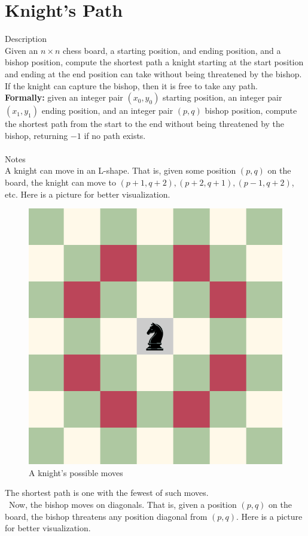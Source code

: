 \documentclass[11pt]{exam}
\begin{document}
\section*{Knight's Path}

{\large Description}\\
Given an $n\times n$ chess board, a starting position, and ending position,
and a bishop position, compute the shortest path a knight starting at the
start position and ending at the end position can take without being
threatened by the bishop. If the knight can capture the bishop, then
it is free to take any path.\\
\textbf{Formally:} given an integer pair $(x_0,y_0)$ starting position, an integer pair $(x_1, y_1)$ ending position, and an integer pair $(p, q)$ bishop position, compute the shortest path from the start to the end without being threatened by the bishop, returning $-1$ if no path exists.\\\\
{\large Notes}\\
A knight can move in an L-shape. That is, given some position $(p,q)$ on
the board, the knight can move to $(p+1,q+2), (p+2,q+1), (p-1,q+2)$, etc.
Here is a picture for better visualization.
\begin{figure}[H]
	\centering
	\includegraphics[width=0.7\linewidth]{knight_moves.png}
	\caption{A knight's possible moves}
\end{figure}
The shortest path is one with the fewest of such moves.\\\
Now, the bishop moves on diagonals. That is, given a position $(p,q)$ on the board, the bishop threatens any position diagonal from $(p, q)$. Here is a picture for better visualization.
\end{document}
